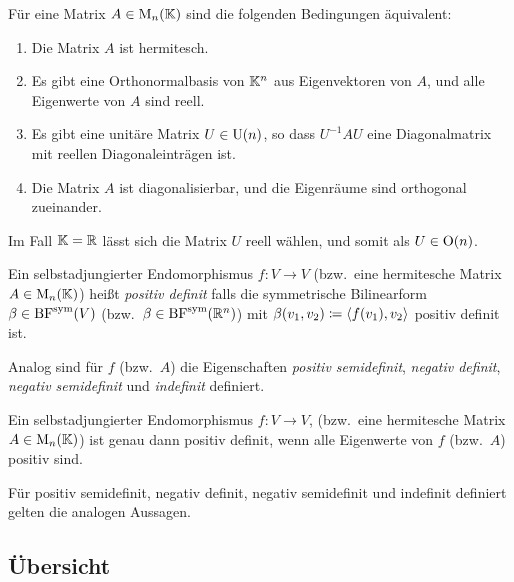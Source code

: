 \begin{corollary}
  \label{corollary: hermitian matrices are diagonalizable}
  Für eine Matrix $A \in \operatorname{M}_{n}(\mathbb{K})$ sind die folgenden Bedingungen äquivalent:
  \begin{enumerate}
    \item
      Die Matrix $A$ ist hermitesch.
    \item
      Es gibt eine Orthonormalbasis von $\mathbb{K}^n$ aus Eigenvektoren von $A$, und alle Eigenwerte von $A$ sind reell.
    \item
      Es gibt eine unitäre Matrix $U \in \operatorname{U}(n)$, so dass $U^{-1} A U$ eine Diagonalmatrix mit reellen Diagonaleinträgen ist.
    \item
      Die Matrix $A$ ist diagonalisierbar, und die Eigenräume sind orthogonal zueinander.
  \end{enumerate}
  Im Fall $\mathbb{K} = \mathbb{R}$ lässt sich die Matrix $U$ reell wählen, und somit als $U \in \operatorname{O}(n)$.
\end{corollary}

\begin{definition}
  Ein selbstadjungierter Endomorphismus $f \colon V \to V$ \textup(bzw.\ eine hermitesche Matrix $A \in \operatorname{M}_{n}(\mathbb{K})$\textup) heißt \emph{positiv definit} falls die symmetrische Bilinearform $\beta \in \operatorname{BF}^{\operatorname{sym}}(V)$ \textup(bzw.\ $\beta \in \operatorname{BF}^{\operatorname{sym}}(\mathbb{R}^n)$\textup) mit $\beta(v_1, v_2) \coloneqq \left\langle f(v_1), v_2 \right\rangle$ positiv definit ist.
  
  Analog sind für $f$ \textup(bzw.\ $A$\textup) die Eigenschaften \emph{positiv semidefinit}, \emph{negativ definit}, \emph{negativ semidefinit} und \emph{indefinit} definiert.
\end{definition}

\begin{corollary}
  Ein selbstadjungierter Endomorphismus $f \colon V \to V$, \textup(bzw.\ eine hermitesche Matrix $A \in \operatorname{M}_{n}(\mathbb{K})$\textup) ist genau dann positiv definit, wenn alle Eigenwerte von $f$ \textup(bzw.\ $A$\textup) positiv sind.
  
  Für positiv semidefinit, negativ definit, negativ semidefinit und indefinit definiert gelten die analogen Aussagen.
\end{corollary}





\subsection{Übersicht}


